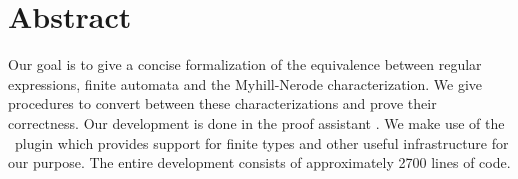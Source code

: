 \chapter*{Abstract}
\label{chap:abstract}


Our goal is to give a concise formalization of the equivalence between regular expressions, finite automata and the Myhill-Nerode characterization. 
We give procedures to convert between these characterizations and prove their correctness.
Our development is done in the proof assistant \coq.
We make use of the \ssreflect\ plugin which provides support for finite types and other useful infrastructure for our purpose.
The entire development consists of approximately 2700 lines of code.
